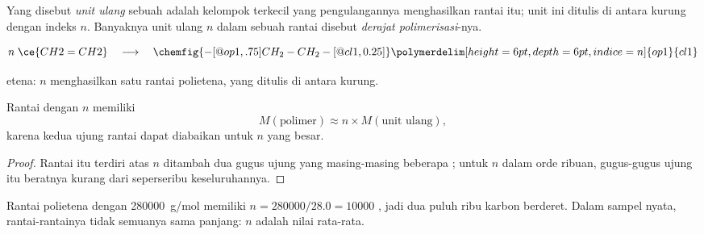\begin{definition}\label{def:g12:polymers:repeat-unit}
Yang disebut \emph{unit ulang} sebuah  adalah
kelompok  terkecil yang pengulangannya menghasilkan rantai itu; unit
ini ditulis di antara kurung dengan indeks $n$. Banyaknya unit ulang $n$
dalam sebuah rantai disebut
\emph{derajat polimerisasi}-nya.
\end{definition}

\begin{omfigure}
\[
  n\;\ce{CH2=CH2}
  \quad\longrightarrow\quad
  \chemfig{-[@{op1,.75}]CH_2-CH_2-[@{cl1,0.25}]}
  \polymerdelim[height=6pt, depth=6pt, indice=n]{op1}{cl1}
\]

{\small {} etena: $n$   menghasilkan satu rantai
polietena, yang   ditulis di antara kurung.}
\end{omfigure}

\begin{proposition}\label{prop:g12:polymers:molar-mass}
Rantai dengan  $n$ memiliki 
\[
  M(\text{polimer}) \approx n \times M(\text{unit ulang}) ,
\]
karena kedua ujung rantai dapat diabaikan untuk $n$ yang besar.
\end{proposition}

\begin{proof}
Rantai itu terdiri atas $n$  ditambah dua gugus ujung yang
masing-masing beberapa ; untuk $n$ dalam orde ribuan, gugus-gugus
ujung itu beratnya kurang dari seperseribu keseluruhannya.
\end{proof}

\begin{example}\label{ex:g12:polymers:pe}
Rantai polietena dengan  \qty{280000}{g/mol} memiliki
$n = 280000/28.0 = 10000$ , jadi dua puluh ribu  karbon
berderet. Dalam sampel nyata, rantai-rantainya tidak semuanya sama
panjang: $n$ adalah nilai rata-rata.
\end{example}

